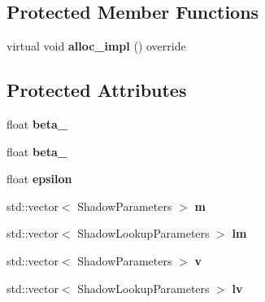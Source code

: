 \subsection*{Protected Member Functions}
\begin{DoxyCompactItemize}
\item 
\hypertarget{structdynet_1_1AdamTrainer_a17f07f2cfcbd03641a12475b2c739a7c}{}virtual void {\bfseries alloc\+\_\+impl} () override\label{structdynet_1_1AdamTrainer_a17f07f2cfcbd03641a12475b2c739a7c}

\end{DoxyCompactItemize}
\subsection*{Protected Attributes}
\begin{DoxyCompactItemize}
\item 
\hypertarget{structdynet_1_1AdamTrainer_aae8746433c7394dddc78849e49402f1f}{}float {\bfseries beta\+\_}\label{structdynet_1_1AdamTrainer_aae8746433c7394dddc78849e49402f1f}

\item 
\hypertarget{structdynet_1_1AdamTrainer_a6089112f88ea42b5c178a3e71b405734}{}float {\bfseries beta\+\_}\label{structdynet_1_1AdamTrainer_a6089112f88ea42b5c178a3e71b405734}

\item 
\hypertarget{structdynet_1_1AdamTrainer_a125ca67ff4ce57e896950102b26679cf}{}float {\bfseries epsilon}\label{structdynet_1_1AdamTrainer_a125ca67ff4ce57e896950102b26679cf}

\item 
\hypertarget{structdynet_1_1AdamTrainer_abae9d7b1df4a4bf4d849dbd2ededc2c8}{}std\+::vector$<$ Shadow\+Parameters $>$ {\bfseries m}\label{structdynet_1_1AdamTrainer_abae9d7b1df4a4bf4d849dbd2ededc2c8}

\item 
\hypertarget{structdynet_1_1AdamTrainer_a36fee69c4827e4a1de6fbcde35977305}{}std\+::vector$<$ Shadow\+Lookup\+Parameters $>$ {\bfseries lm}\label{structdynet_1_1AdamTrainer_a36fee69c4827e4a1de6fbcde35977305}

\item 
\hypertarget{structdynet_1_1AdamTrainer_a3e0f0cfdf210edd1c6e7c258bf5f480c}{}std\+::vector$<$ Shadow\+Parameters $>$ {\bfseries v}\label{structdynet_1_1AdamTrainer_a3e0f0cfdf210edd1c6e7c258bf5f480c}

\item 
\hypertarget{structdynet_1_1AdamTrainer_a641513dd5cba85c96e35a275ecf3f2b5}{}std\+::vector$<$ Shadow\+Lookup\+Parameters $>$ {\bfseries lv}\label{structdynet_1_1AdamTrainer_a641513dd5cba85c96e35a275ecf3f2b5}

\end{DoxyCompactItemize}
